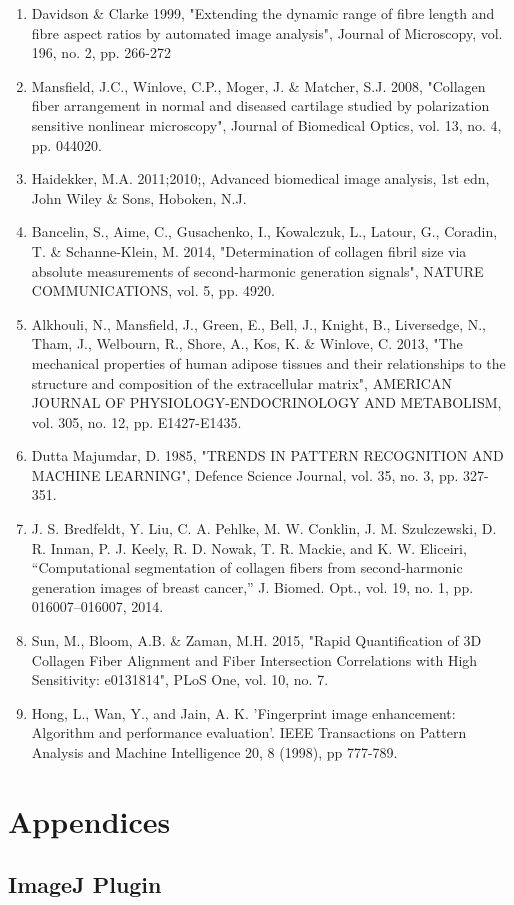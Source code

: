 \documentclass[12pt,a4paper]{article}
\begin{document}
\begin{enumerate}
\item Davidson \& Clarke 1999, "Extending the dynamic range of fibre length and fibre aspect ratios by automated image analysis", Journal of Microscopy, vol. 196, no. 2, pp. 266-272
\item Mansfield, J.C., Winlove, C.P., Moger, J. \& Matcher, S.J. 2008, "Collagen fiber arrangement in normal and diseased cartilage studied by polarization sensitive nonlinear microscopy", Journal of Biomedical Optics, vol. 13, no. 4, pp. 044020.
\item Haidekker, M.A. 2011;2010;, Advanced biomedical image analysis, 1st edn, John Wiley \& Sons, Hoboken, N.J.
\item Bancelin, S., Aime, C., Gusachenko, I., Kowalczuk, L., Latour, G., Coradin, T. \& Schanne-Klein, M. 2014, "Determination of collagen fibril size via absolute measurements of second-harmonic generation signals", NATURE COMMUNICATIONS, vol. 5, pp. 4920.
\item Alkhouli, N., Mansfield, J., Green, E., Bell, J., Knight, B., Liversedge, N., Tham, J., Welbourn, R., Shore, A., Kos, K. \& Winlove, C. 2013, "The mechanical properties of human adipose tissues and their relationships to the structure and composition of the extracellular matrix", AMERICAN JOURNAL OF PHYSIOLOGY-ENDOCRINOLOGY AND METABOLISM, vol. 305, no. 12, pp. E1427-E1435.
\item Dutta Majumdar, D. 1985, "TRENDS IN PATTERN RECOGNITION AND MACHINE LEARNING", Defence Science Journal, vol. 35, no. 3, pp. 327-351.
\item J. S. Bredfeldt, Y. Liu, C. A. Pehlke, M. W. Conklin, J. M. Szulczewski, D. R. Inman, P. J. Keely, R. D. Nowak, T. R. Mackie, and K. W. Eliceiri, “Computational segmentation of collagen fibers from second-harmonic generation images of breast cancer,” J. Biomed. Opt., vol. 19, no. 1, pp. 016007–016007, 2014.
\item Sun, M., Bloom, A.B. \& Zaman, M.H. 2015, "Rapid Quantification of 3D Collagen Fiber Alignment and Fiber Intersection Correlations with High Sensitivity: e0131814", PLoS One, vol. 10, no. 7.
\item Hong, L., Wan, Y., and Jain, A. K. 'Fingerprint image enhancement: Algorithm and performance evaluation'. IEEE Transactions on Pattern Analysis and Machine Intelligence 20, 8 (1998), pp 777-789.

\end{enumerate}

\newpage
\thispagestyle{empty}
\section{Appendices}

\subsection{ImageJ Plugin}

\renewcommand{\baselinestretch}{1.0}\normalsize
\thispagestyle{empty}


\thispagestyle{empty}
\end{document}
